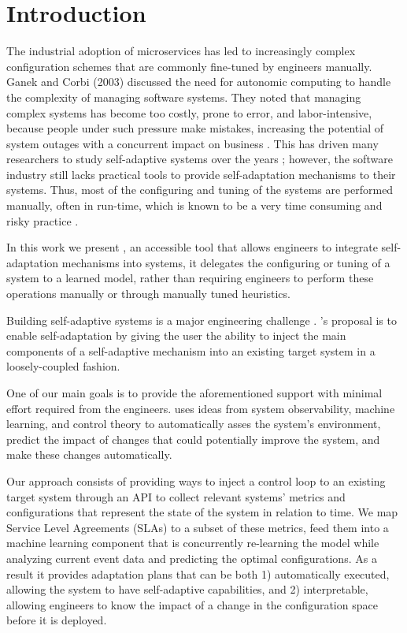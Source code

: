\section{Introduction}

The industrial adoption of microservices has led to increasingly complex configuration schemes that are commonly fine-tuned by engineers manually. Ganek and Corbi (2003) discussed the need for autonomic computing to handle the complexity of managing software systems. They noted that managing complex systems has become too costly, prone to error, and labor-intensive, because people under such pressure make mistakes, increasing the potential of system outages with a concurrent impact on business \cite{ganek_dawning_2003}. This has driven many researchers to study self-adaptive systems over the years \cite{porter_rex:_2016, andrew_pavlo_self-driving_2017, salehie_self-adaptive_2009, ganapathi_predicting_2009, herbst_self-adaptive_2014, faniyi_architecting_2014}; however, the software industry still lacks practical tools to provide self-adaptation mechanisms to their systems. Thus, most of the configuring and tuning of the systems are performed manually, often in run-time, which is known to be a very time consuming and risky practice \cite{ganek_dawning_2003, using_prob_reasoning_automate_software_tuning, de_lemos_software_2013}.

In this work we present \projectname{}, an accessible tool that allows engineers to integrate self-adaptation mechanisms into systems, it delegates the configuring or tuning of a system to a learned model, rather than requiring engineers to perform these operations manually or through manually tuned heuristics.

Building self-adaptive systems is a major engineering challenge \cite{brun_engineering_2009}. \projectname{}'s proposal is to enable self-adaptation by giving the user the ability to inject the main components of a self-adaptive mechanism into an existing target system in a loosely-coupled fashion.

One of our main goals is to provide the aforementioned support with minimal effort required from the engineers. \projectname{} uses ideas from system observability, machine learning, and control theory to automatically asses the system's environment, predict the impact of changes that could potentially improve the system, and make these changes automatically.

Our approach consists of providing ways to inject a control loop to an existing target system through an API to collect relevant systems' metrics and configurations that represent the state of the system in relation to time. We map Service Level Agreements (SLAs) to a subset of these metrics, feed them into a machine learning component that is concurrently re-learning the model while analyzing current event data and predicting the optimal configurations. As a result it provides adaptation plans that can be both 1) automatically executed, allowing the system to have self-adaptive capabilities, and 2) interpretable, allowing engineers to know the impact of a change in the configuration space before it is deployed.

